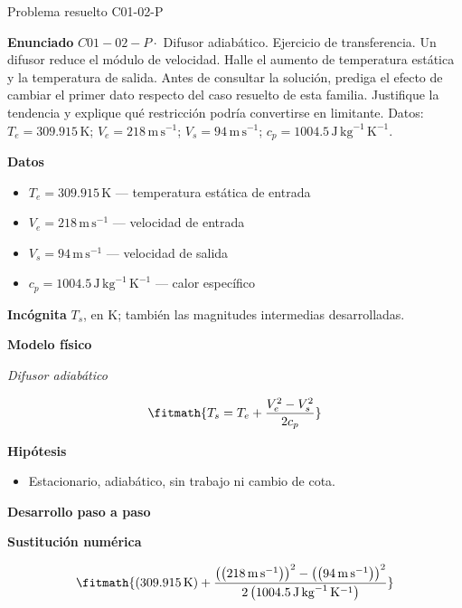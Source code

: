 \documentclass[10pt,openany]{book}
\begin{document}
\begin{studiumworked}{Problema resuelto C01-02-P}


\noindent\textbf{Enunciado}
\(C01-02-P \cdot\) Difusor adiabático. Ejercicio de transferencia. Un difusor reduce el módulo de velocidad. Halle el aumento de temperatura estática y la temperatura de salida. Antes de consultar la solución, prediga el efecto de cambiar el primer dato respecto del caso resuelto de esta familia. Justifique la tendencia y explique qué restricción podría convertirse en limitante. Datos: \(T_e=309.915\, \mathrm{K}\); \(V_e=218\, \mathrm{m}\,\mathrm{s}^{-1}\); \(V_s=94\, \mathrm{m}\,\mathrm{s}^{-1}\); \(c_p=1004.5\, \mathrm{J}\,\mathrm{kg}^{-1}\,\mathrm{K}^{-1}\).

\noindent\textbf{Datos}
\begin{itemize}
\item $T_e = 309.915\,\mathrm{K}$ — temperatura estática de entrada
\item $V_e = 218\,\mathrm{m}\,\mathrm{s}^{-1}$ — velocidad de entrada
\item $V_s = 94\,\mathrm{m}\,\mathrm{s}^{-1}$ — velocidad de salida
\item $c_p = 1004.5\,\mathrm{J}\,\mathrm{kg}^{-1}\,\mathrm{K}^{-1}$ — calor específico
\end{itemize}

\noindent\textbf{Incógnita}
$T_s$, en $\mathrm{K}$; también las magnitudes intermedias desarrolladas.

\noindent\textbf{Modelo físico}

\noindent\textit{Difusor adiabático}

\[
\fitmath{T_s=T_e + \frac{V_e^{2} - V_s^{2}}{2 c_p}}
\]

\noindent\textbf{Hipótesis}
\begin{itemize}
\item Estacionario, adiabático, sin trabajo ni cambio de cota.
\end{itemize}

\noindent\textbf{Desarrollo paso a paso}



\noindent\textbf{Sustitución numérica}

\[
\fitmath{\left(309.915\,\mathrm{K}\right) + \frac{\left(\left(218\,\mathrm{m}\,\mathrm{s}^{-1}\right)\right)^{2} - \left(\left(94\,\mathrm{m}\,\mathrm{s}^{-1}\right)\right)^{2}}{2 \left(1004.5\,\mathrm{J}\,\mathrm{kg}^{-1}\,\mathrm{K}^{-1}\right)}}
\]


\end{studiumworked}
\end{document}
